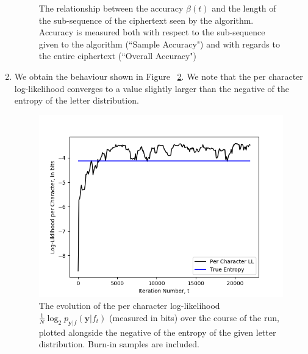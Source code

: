 \documentclass[secnumaric,notitlepage,amsmath,amssymb,nofootinbib,floatfix,12pt]{revtex4-1}
\begin{document}
\begin{enumerate}[label=(\alph*)]
\begin{figure}[htb]
\caption{The relationship between the accuracy $\beta(t)$ and the length of the sub-sequence of the ciphertext seen by the algorithm. Accuracy is measured both with respect to the sub-sequence given to the algorithm (``Sample Accuracy") and with regards to the entire ciphertext (``Overall Accuracy")}
\label{fig:accuracy-vs-length}
\end{figure}
\item We obtain the behaviour shown in Figure ~\ref{fig:per-char-ll}. We note that the per character log-likelihood converges to a value slightly larger than the negative of the entropy of the letter distribution.
\begin{figure}[htb]
\includegraphics[scale=0.6]{../plots/per_character_log-likelihood_vs_iteration.png}
\caption{The evolution of the per character log-likelihood $\frac{1}{N} \log_2 p_{\mathbf{y}|f}(\mathbf{y}|f_t)$ (measured in bits) over the course of the run, plotted alongside the negative of the entropy of the given letter distribution. Burn-in samples are included.}
\label{fig:per-char-ll}
\end{figure}
\end{enumerate}
\end{document}
